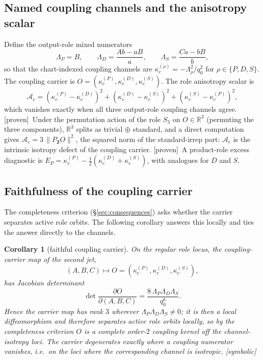 \documentclass[11pt]{article}
\newcommand{\Proven}{\textsf{[proven]}}
\newcommand{\Symbolic}{\textsf{[symbolic]}}
\theoremstyle{plain}
\newtheorem{corollary}{Corollary}
\theoremstyle{definition}
\newcommand{\Ac}{\mathcal{A}_c}
\newcommand{\kcrole}[1]{\kappa_{c}^{(#1)}}   %
\begin{document}
\subsection{Named coupling channels and the anisotropy scalar}
Define the output-role mixed numerators
\[
\Lambda_P=B,\qquad
\Lambda_D=\frac{Ab-aB}{a},\qquad
\Lambda_S=\frac{Ca-bB}{b},
\]
so that the chart-indexed coupling channels are $\kcrole{\rho}=-\Lambda_\rho^2/q_0^2$ for
$\rho\in\{P,D,S\}$. The coupling carrier is $O=(\kcrole{P},\kcrole{D},\kcrole{S})$. The role anisotropy
scalar is
\[
\Ac=(\kcrole{P}-\kcrole{D})^2+(\kcrole{D}-\kcrole{S})^2+(\kcrole{S}-\kcrole{P})^2,
\]
which vanishes exactly when all three output-role coupling channels agree. \Proven\ Under the
permutation action of the role $S_3$ on $O\in\mathbb R^3$ (permuting the three components),
$\mathbb R^3$ splits as trivial $\oplus$ standard, and a direct computation gives
$\Ac=3\,\lVert P_{\mathbf 2}O\rVert^2$, the squared norm of the standard-irrep part: $\Ac$ is the
intrinsic isotropy defect of the coupling carrier. \Proven\ A product-role excess diagnostic is
$E_P=\kcrole{P}-\tfrac12(\kcrole{D}+\kcrole{S})$, with analogues for $D$ and $S$.

\subsection{Faithfulness of the coupling carrier}
\label{sec:faithful}
The completeness criterion (\S\ref{sec:consequences}) asks whether the carrier separates active role
orbits. The following corollary answers this locally and ties the answer directly to the channels.

\begin{corollary}[faithful coupling carrier]
\label{cor:faithful}
On the regular role locus, the coupling-carrier map of the second jet,
\[
(A,B,C)\longmapsto O=(\kcrole{P},\kcrole{D},\kcrole{S}),
\]
has Jacobian determinant
\[
\det\frac{\partial O}{\partial(A,B,C)}=\frac{8\,\Lambda_P\Lambda_D\Lambda_S}{q_0^{6}} .
\]
Hence the carrier map has rank $3$ wherever $\Lambda_P\Lambda_D\Lambda_S\ne0$; it is then a local
diffeomorphism and therefore separates active role orbits locally, so by the completeness criterion
$O$ is a complete order-$2$ coupling kernel off the channel-isotropy loci. The carrier degenerates
exactly where a coupling numerator vanishes, i.e.\ on the loci where the corresponding channel is
isotropic. \Symbolic
\end{corollary}
\end{document}
